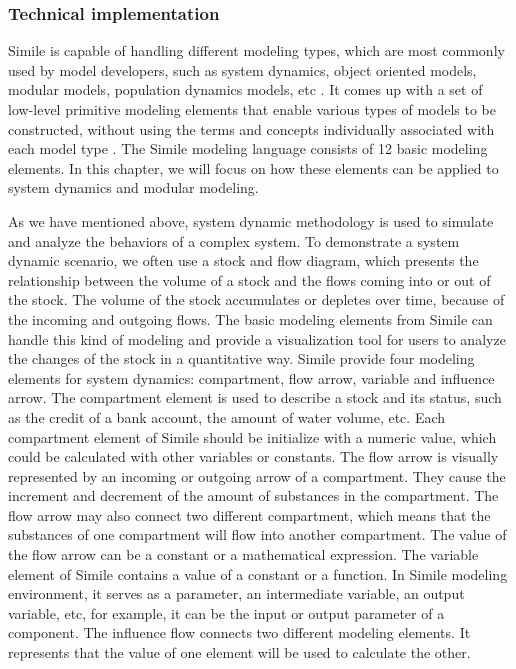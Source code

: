 \subsubsection{Technical implementation}
\par
Simile is capable of handling different modeling types, which are most commonly used by model developers, such as system dynamics, object oriented models, modular models, population dynamics models, etc \autocite{dsl:simile-simulistics}. It comes up with a set of low-level primitive modeling elements that enable various types of models to be constructed, without using the terms and concepts individually associated with each model type \autocite{dsl:simile-muetzelfeldt}. The Simile modeling language consists of 12 basic modeling elements. In this chapter, we will focus on how these elements can be applied to system dynamics and modular modeling.
\par
As we have mentioned above, system dynamic methodology is used to simulate and analyze the behaviors of a complex system. To demonstrate a system dynamic scenario, we often use a stock and flow diagram, which presents the relationship between the volume of a stock and the flows coming into or out of the stock. The volume of the stock accumulates or depletes over time, because of the incoming and outgoing flows. The basic modeling elements from Simile can handle this kind of modeling and provide a visualization tool for users to analyze the changes of the stock in a quantitative way. Simile provide four modeling elements for system dynamics: compartment, flow arrow, variable and influence arrow. The compartment element is used to describe a stock and its status, such as the credit of a bank account, the amount of water volume, etc. Each compartment element of Simile should be initialize with a numeric value, which could be calculated with other variables or constants. The flow arrow is visually represented by an incoming or outgoing arrow of a compartment. They cause the increment and decrement of the amount of substances in the compartment. The flow arrow may also connect two different compartment, which means that the substances of one compartment will flow into another compartment. The value of the flow arrow can be a constant or a mathematical expression. The variable element of Simile contains a value of a constant or a function. In Simile modeling environment, it serves as a parameter, an intermediate variable, an output variable, etc, for example, it can be the input or output parameter of a component. The influence flow connects two different modeling elements. It represents that the value of one element will be used to calculate the other.
